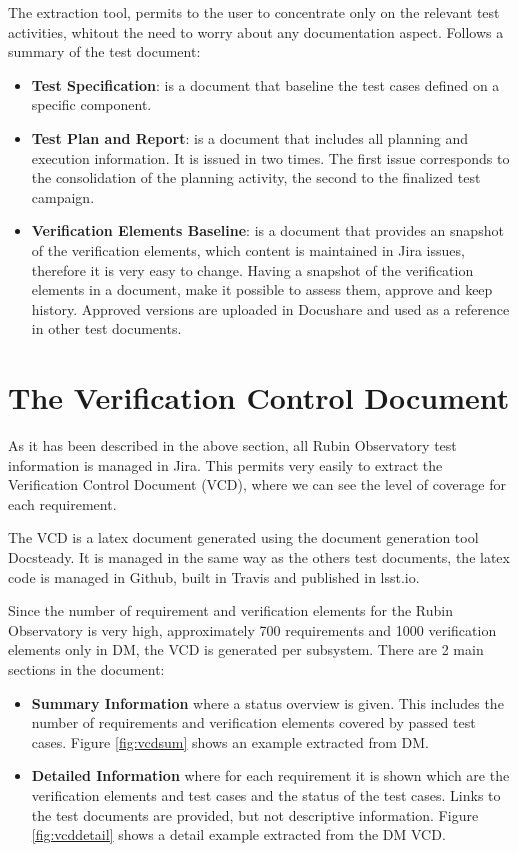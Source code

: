 The extraction tool, permits to the user to concentrate only on the relevant test activities, whitout the need to worry about any documentation aspect.
Follows a summary of the test document:

\begin{itemize}
\item \textbf{Test Specification}: is a document that baseline the test cases defined on a specific component.
\item \textbf{Test Plan and Report}: is a document that includes all planning and execution information. 
It  is issued in two times. The first issue corresponds to the consolidation of the planning activity,  the second to the finalized test campaign.
\item \textbf{Verification Elements Baseline}: is a document that provides an snapshot of the verification elements,
 which content is maintained in Jira issues, therefore it is very easy to change.
Having a snapshot of the verification elements in a document, make it possible to assess them, approve and keep history.
Approved versions are uploaded in Docushare and used as a reference in other test documents.
\end{itemize}


\section{The Verification Control Document}

As it has been described in the above section, all Rubin Observatory test information is managed in Jira. 
This permits very easily to extract the Verification Control Document (VCD), where we can see the level of coverage for each requirement.

The VCD is a latex document generated using the document generation tool Docsteady. 
It is managed in the same way as the others test documents, the latex code is managed in Github,
built in Travis and published in lsst.io.

Since the number of requirement and verification elements for the Rubin Observatory is very high, 
approximately 700 requirements and 1000 verification elements only in DM, the VCD is generated per subsystem.
There are 2 main sections in the document:

\begin{itemize}
\item \textbf{Summary Information} where a status overview is given. 
This includes the number of requirements and verification elements covered by passed test cases.
Figure \ref{fig:vcdsum} shows an example extracted from DM.
\item \textbf{Detailed Information} where for each requirement it is shown which are the verification elements and test cases
and the status of the test cases. Links to the test documents are provided, but not descriptive information.
Figure \ref{fig:vcddetail} shows a detail example extracted from the DM VCD.
\end{itemize}

